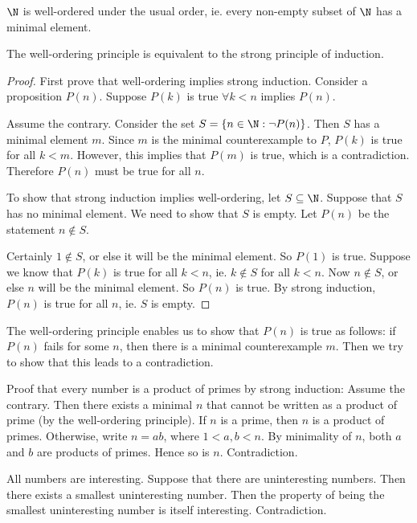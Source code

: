 \documentclass[a4paper]{article}
\begin{document}
\begin{thm}
  $\N$ is well-ordered under the usual order, ie. every non-empty subset of $\N$ has a minimal element.
\end{thm}

\begin{thm}
  The well-ordering principle is equivalent to the strong principle of induction.
\end{thm}

\begin{proof}
  First prove that well-ordering implies strong induction. Consider a proposition $P(n)$. Suppose $P(k)$ is true $\forall k < n$ implies $P(n)$.

  Assume the contrary. Consider the set $S = \{n\in \N : \neg P(n)\}$. Then $S$ has a minimal element $m$. Since $m$ is the minimal counterexample to $P$, $P(k)$ is true for all $k < m$. However, this implies that $P(m)$ is true, which is a contradiction. Therefore $P(n)$ must be true for all $n$.

  To show that strong induction implies well-ordering, let $S\subseteq \N$. Suppose that $S$ has no minimal element. We need to show that $S$ is empty. Let $P(n)$ be the statement $n\not\in S$.

  Certainly $1\not\in S$, or else it will be the minimal element. So $P(1)$ is true. Suppose we know that $P(k)$ is true for all $k < n$, ie. $k\not\in S$ for all $k < n$. Now $n\not\in S$, or else $n$ will be the minimal element. So $P(n)$ is true. By strong induction, $P(n)$ is true for all $n$, ie. $S$ is empty.
\end{proof}
The well-ordering principle enables us to show that $P(n)$ is true as follows: if $P(n)$ fails for some $n$, then there is a minimal counterexample $m$. Then we try to show that this leads to a contradiction.

\begin{eg}
  Proof that every number is a product of primes by strong induction: Assume the contrary. Then there exists a minimal $n$ that cannot be written as a product of prime (by the well-ordering principle). If $n$ is a prime, then $n$ is a product of primes. Otherwise, write $n = ab$, where $1 < a, b < n$. By minimality of $n$, both $a$ and $b$ are products of primes. Hence so is $n$. Contradiction.
\end{eg}

\begin{eg}
  All numbers are interesting. Suppose that there are uninteresting numbers. Then there exists a smallest uninteresting number. Then the property of being the smallest uninteresting number is itself interesting. Contradiction.
\end{eg}
\end{document}
